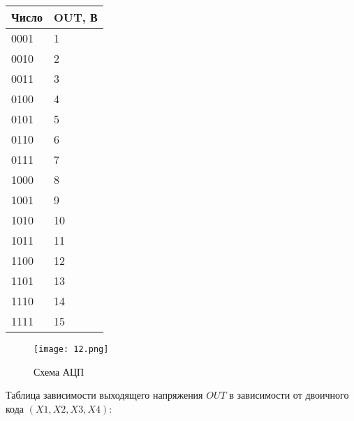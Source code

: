 \documentclass[a4paper, 12pt]{article}%
\begin{document}
\begin{table}[h!]
\centering
\begin{tabular}{|l|l|}
\hline
Число & OUT, В \\ \hline
0001  & 1      \\ \hline
0010  & 2      \\ \hline
0011  & 3      \\ \hline
0100  & 4      \\ \hline
0101  & 5      \\ \hline
0110  & 6      \\ \hline
0111  & 7      \\ \hline
1000  & 8      \\ \hline
1001  & 9      \\ \hline
1010  & 10	   \\ \hline
1011  & 11     \\ \hline
1100  & 12     \\ \hline
1101  & 13     \\ \hline
1110  & 14     \\ \hline
1111  & 15     \\ \hline
\end{tabular}
\end{table}

\begin{figure}[h!]
    \centering
    \texttt{[image: 12.png]}
    \caption{Схема АЦП}
    \label{fig:vac}
\end{figure}

Таблица зависимости выходящего напряжения $OUT$ в зависимости от двоичного кода $(X1,X2,X3,X4)$:













					
\end{document}
